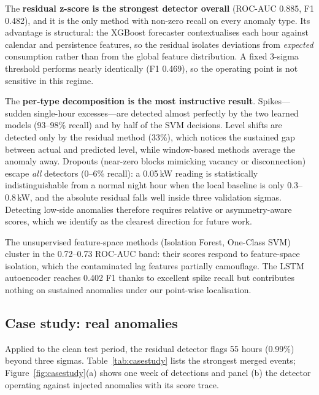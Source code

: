\documentclass[10pt,a4paper]{article}
\begin{document}
The \textbf{residual z-score is the strongest detector overall} (ROC-AUC 0.885,
F1 0.482), and it is the only method with non-zero recall on every anomaly type. Its
advantage is structural: the XGBoost forecaster contextualises each hour against
calendar and persistence features, so the residual isolates deviations from
\emph{expected} consumption rather than from the global feature distribution.
A fixed 3-sigma threshold performs nearly identically (F1 0.469), so the operating
point is not sensitive in this regime.

The \textbf{per-type decomposition is the most instructive result}. Spikes---sudden
single-hour excesses---are detected almost perfectly by the two learned models
(93--98\% recall) and by half of the SVM decisions. Level shifts are detected only by
the residual method (33\%), which notices the sustained gap between actual and
predicted level, while window-based methods average the anomaly away. Dropouts
(near-zero blocks mimicking vacancy or disconnection) escape \emph{all} detectors
(0--6\% recall): a 0.05\,kW reading is statistically indistinguishable from a normal
night hour when the local baseline is only 0.3--0.8\,kW, and the absolute residual
falls well inside three validation sigmas. Detecting low-side anomalies therefore
requires relative or asymmetry-aware scores, which we identify as the clearest
direction for future work.

The unsupervised feature-space methods (Isolation Forest, One-Class SVM) cluster in
the 0.72--0.73 ROC-AUC band: their scores respond to feature-space isolation, which
the contaminated lag features partially camouflage. The LSTM autoencoder reaches
0.402 F1 thanks to excellent spike recall but contributes nothing on sustained
anomalies under our point-wise localisation.

\subsection{Case study: real anomalies}
Applied to the clean test period, the residual detector flags 55 hours (0.99\%)
beyond three sigmas. Table~\ref{tab:casestudy} lists the strongest merged events;
Figure~\ref{fig:casestudy}(a) shows one week of detections and panel (b) the
detector operating against injected anomalies with its score trace.
\end{document}
